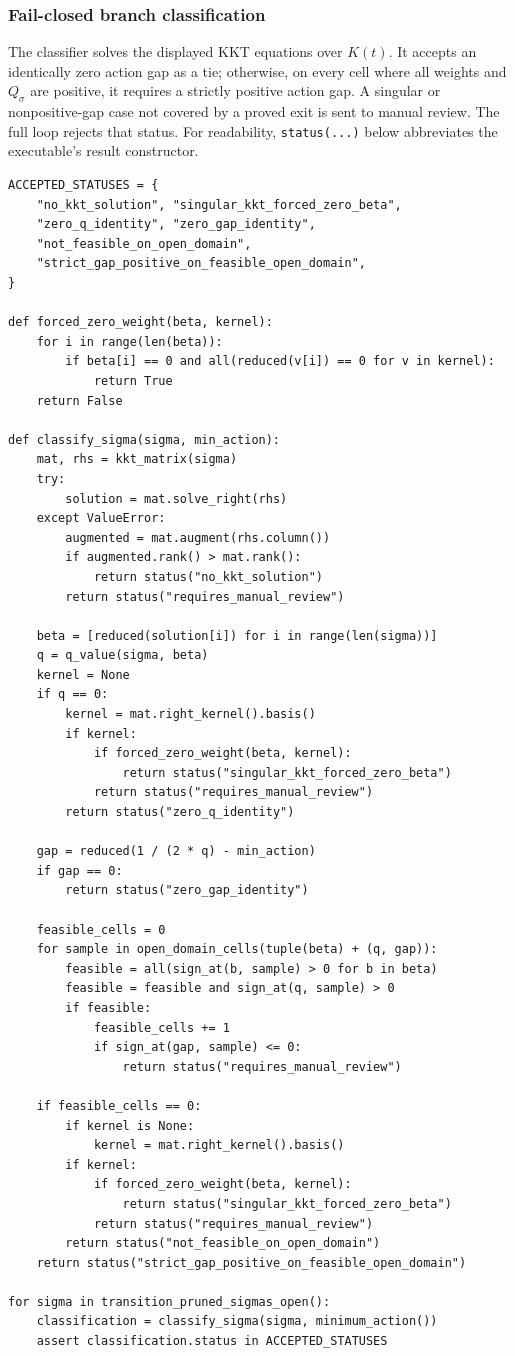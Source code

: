 \subsubsection*{Fail-closed branch classification}
The classifier solves the displayed KKT equations over \(K(t)\).  It accepts
an identically zero action gap as a tie; otherwise, on every cell where all
weights and \(Q_\sigma\) are positive, it requires a strictly positive action
gap.  A singular or nonpositive-gap case not covered by a proved exit is sent
to manual review.  The full loop rejects that status.
For readability, \texttt{status(...)} below abbreviates the executable's
result constructor.

{\small
\begin{verbatim}
ACCEPTED_STATUSES = {
    "no_kkt_solution", "singular_kkt_forced_zero_beta",
    "zero_q_identity", "zero_gap_identity",
    "not_feasible_on_open_domain",
    "strict_gap_positive_on_feasible_open_domain",
}

def forced_zero_weight(beta, kernel):
    for i in range(len(beta)):
        if beta[i] == 0 and all(reduced(v[i]) == 0 for v in kernel):
            return True
    return False

def classify_sigma(sigma, min_action):
    mat, rhs = kkt_matrix(sigma)
    try:
        solution = mat.solve_right(rhs)
    except ValueError:
        augmented = mat.augment(rhs.column())
        if augmented.rank() > mat.rank():
            return status("no_kkt_solution")
        return status("requires_manual_review")

    beta = [reduced(solution[i]) for i in range(len(sigma))]
    q = q_value(sigma, beta)
    kernel = None
    if q == 0:
        kernel = mat.right_kernel().basis()
        if kernel:
            if forced_zero_weight(beta, kernel):
                return status("singular_kkt_forced_zero_beta")
            return status("requires_manual_review")
        return status("zero_q_identity")

    gap = reduced(1 / (2 * q) - min_action)
    if gap == 0:
        return status("zero_gap_identity")

    feasible_cells = 0
    for sample in open_domain_cells(tuple(beta) + (q, gap)):
        feasible = all(sign_at(b, sample) > 0 for b in beta)
        feasible = feasible and sign_at(q, sample) > 0
        if feasible:
            feasible_cells += 1
            if sign_at(gap, sample) <= 0:
                return status("requires_manual_review")

    if feasible_cells == 0:
        if kernel is None:
            kernel = mat.right_kernel().basis()
        if kernel:
            if forced_zero_weight(beta, kernel):
                return status("singular_kkt_forced_zero_beta")
            return status("requires_manual_review")
        return status("not_feasible_on_open_domain")
    return status("strict_gap_positive_on_feasible_open_domain")

for sigma in transition_pruned_sigmas_open():
    classification = classify_sigma(sigma, minimum_action())
    assert classification.status in ACCEPTED_STATUSES
\end{verbatim}
}

